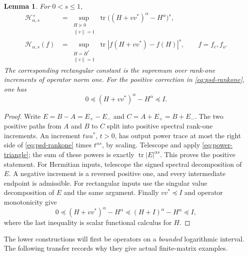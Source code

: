 \documentclass[11pt]{article}
\newtheorem{lemma}[theorem]{Lemma}
\numberwithin{equation}{section}
\newcommand{\tr}{\operatorname{tr}}
\newcommand{\cH}{\mathcal H}
\begin{document}
\begin{lemma}\label{lem:rankone}
For $0<s\le1$,
\begin{align}
 \cH^+_{\alpha,s}
  &=\sup_{\substack{H\succeq0\\\|v\|=1}}
       \tr\big((H+vv^*)^\alpha-H^\alpha\big)^s,       \label{eq:psd-rankone}\\
 \cH_{\alpha,s}(f)
  &=\sup_{\substack{H=H^*\\\|v\|=1}}
       \tr|f(H+vv^*)-f(H)|^s,
       \qquad f=f_e,f_o.                              \label{eq:herm-rankone}
\end{align}
The corresponding rectangular constant is the supremum over rank-one
increments of operator norm one. For the positive correction in
\eqref{eq:psd-rankone}, one has
\begin{equation}\label{eq:psd-norm}
 0\preceq(H+vv^*)^\alpha-H^\alpha\preceq I.
\end{equation}
\end{lemma}
\begin{proof}
Write $E=B-A=E_+-E_-$ and $C=A+E_+=B+E_-$. The two positive paths
from $A$ and $B$ to $C$ split into positive spectral rank-one
increments. An increment $tuu^*$, $t>0$, has output power trace at most
the right side of \eqref{eq:psd-rankone} times $t^{\alpha s}$, by scaling.
Telescope and apply \eqref{eq:power-triangle}; the sum of these powers
is exactly $\tr|E|^{\alpha s}$. This proves the positive statement.
For Hermitian inputs, telescope the signed spectral decomposition of $E$.
A negative increment is a reversed positive one, and every intermediate
endpoint is admissible. For rectangular inputs use the singular value
decomposition of $E$ and the same argument.
Finally $vv^*\preceq I$ and operator monotonicity give
\[
 0\preceq(H+vv^*)^\alpha-H^\alpha
 \preceq(H+I)^\alpha-H^\alpha\preceq I,
\]
where the last inequality is scalar functional calculus for $H$.
\end{proof}

The lower constructions will first be operators on a \emph{bounded}
logarithmic interval. The following transfer records why they give
actual finite-matrix examples.
\end{document}
